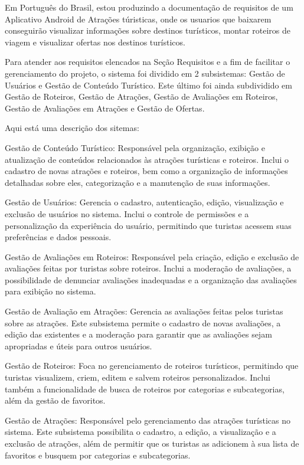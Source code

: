 Em Português do Brasil, estou produzindo a documentação de requisitos de um Aplicativo Android de Atrações túristicas, onde os usuarios que baixarem conseguirão visualizar informações sobre destinos turísticos, montar roteiros de viagem e visualizar ofertas nos destinos turísticos.

Para atender aos requisitos elencados na Seção Requisitos e a fim de facilitar o gerenciamento do projeto, o sistema foi dividido em 2 subsistemas: Gestão de Usuários e Gestão de Conteúdo Turístico. Este último
foi ainda subdividido em Gestão de Roteiros, Gestão de Atrações, Gestão de Avaliações em Roteiros, Gestão de Avaliações em Atrações e Gestão de Ofertas. 

Aqui está uma descrição dos sitemas:

Gestão de Conteúdo Turístico:
Responsável pela organização, exibição e atualização de conteúdos relacionados às atrações turísticas e roteiros. Inclui o cadastro de novas atrações e roteiros, bem como a organização de informações detalhadas sobre eles, categorização e a manutenção de suas informações.
	
Gestão de Usuários:
Gerencia o cadastro, autenticação, edição, visualização e exclusão de usuários no sistema. Inclui o controle de permissões e a personalização da experiência do usuário, permitindo que turistas acessem suas preferências e dados pessoais.
	
Gestão de Avaliações em Roteiros:
Responsável pela criação, edição e exclusão de avaliações feitas por turistas sobre roteiros. Inclui a moderação de avaliações, a possibilidade de denunciar avaliações inadequadas e a organização das avaliações para exibição no sistema.

Gestão de Avaliação em Atrações:
Gerencia as avaliações feitas pelos turistas sobre as atrações. Este subsistema permite o cadastro de novas avaliações, a edição das existentes e a moderação para garantir que as avaliações sejam apropriadas e úteis para outros usuários.

Gestão de Roteiros:
Foca no gerenciamento de roteiros turísticos, permitindo que turistas visualizem, criem, editem e salvem roteiros personalizados. Inclui também a funcionalidade de busca de roteiros por categorias e subcategorias, além da gestão de favoritos.

Gestão de Atrações:
Responsável pelo gerenciamento das atrações turísticas no sistema. Este subsistema possibilita o cadastro, a edição, a visualização e a exclusão de atrações, além de permitir que os turistas as adicionem à sua lista de favoritos e busquem por categorias e subcategorias.

